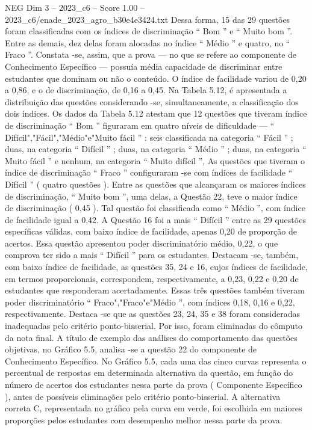 \begin{textsample}{NEG Dim 3 – 2023\_c6 – Score 1.00 – 2023\_c6/enade\_2023\_agro\_b30e4e3424.txt}
Dessa forma, 15 das 29 questões foram classificadas com os índices de discriminação “ Bom ” e “ Muito bom ”.
Entre as demais, dez delas foram alocadas no índice “ Médio ” e quatro, no “ Fraco ”.
Constata -se, assim, que a prova — no que se refere ao componente de Conhecimento Específico — possuía média capacidade de discriminar entre estudantes que dominam ou não o conteúdo.
O índice de facilidade variou de 0,20 a 0,86, e o de discriminação, de 0,16 a 0,45.
Na Tabela 5.12, é apresentada a distribuição das questões considerando -se, simultaneamente, a classificação dos dois índices.
Os dados da Tabela 5.12 atestam que 12 questões que tiveram índice de discriminação “ Bom ” figuraram em quatro níveis de dificuldade — “ Difícil","Fácil","Médio"e"Muito fácil ” : seis classificada na categoria “ Fácil ” ; duas, na categoria “ Difícil ” ; duas, na categoria “ Médio ” ; duas, na categoria “ Muito fácil ” e nenhum, na categoria “ Muito difícil ”, As questões que tiveram o índice de discriminação “ Fraco ” configuraram -se com índices de facilidade “ Difícil ” ( quatro questões ).
Entre as questões que alcançaram os maiores índices de discriminação, “ Muito bom ”, uma delas, a Questão 22, teve o maior índice de discriminação ( 0,45 ).
Tal questão foi classificada como “ Médio ”, com índice de facilidade igual a 0,42.
A Questão 16 foi a mais “ Difícil ” entre as 29 questões específicas válidas, com baixo índice de facilidade, apenas 0,20 de proporção de acertos.
Essa questão apresentou poder discriminatório médio, 0,22, o que comprova ter sido a mais “ Difícil ” para os estudantes.
Destacam -se, também, com baixo índice de facilidade, as questões 35, 24 e 16, cujos índices de facilidade, em termos proporcionais, correspondem, respectivamente, a 0,23, 0,22 e 0,20 de estudantes que responderam acertadamente.
Essas três questões também tiveram poder discriminatório “ Fraco","Fraco"e"Médio ”, com índices 0,18, 0,16 e 0,22, respectivamente.
Destaca -se que as questões 23, 24, 35 e 38 foram consideradas inadequadas pelo critério ponto-bisserial.
Por isso, foram eliminadas do cômputo da nota final.
A título de exemplo das análises do comportamento das questões objetivas, no Gráfico 5.5, analisa -se a questão 22 do componente de Conhecimento Específico.
No Gráfico 5.5, cada uma das cinco curvas representa o percentual de respostas em determinada alternativa da questão, em função do número de acertos dos estudantes nessa parte da prova ( Componente Específico ), antes de possíveis eliminações pelo critério ponto-bisserial.
A alternativa correta C, representada no gráfico pela curva em verde, foi escolhida em maiores proporções pelos estudantes com desempenho melhor nessa parte da prova.

\end{textsample}
